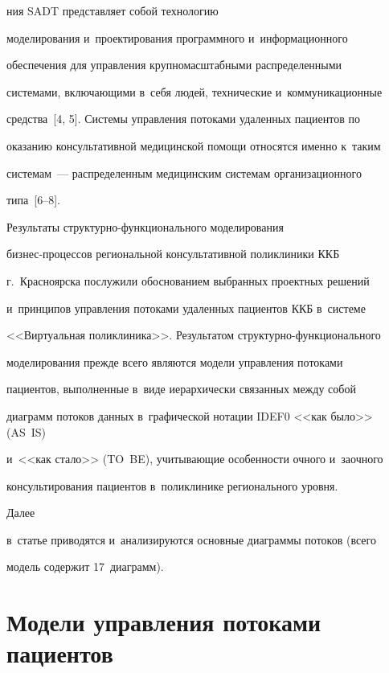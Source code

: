 \noindent


ния SADT представляет собой технологию 


моделирования и~проектирования программного и~информационного 


обеспечения для управления крупномасштабными распределенными 


системами, включающими в~себя людей, технические и~коммуникационные 


средства~[4, 5]. Системы управления потоками удаленных пациентов по 


оказанию консультативной медицинской помощи относятся именно к~таким 


системам~--- распределенным медицинским системам организационного 


типа~[6--8].


  


  Результаты структурно-функционального моделирования  


биз\-нес-про\-цес\-сов региональной консультативной поликлиники ККБ 


г.~Красноярска послужили обоснованием выбранных проектных решений 


и~принципов управления потоками удаленных пациентов ККБ в~системе 


<<Виртуальная поликлиника>>. Результатом струк\-тур\-но-функ\-ци\-о\-наль\-но\-го 


моделирования прежде всего являются модели управления потоками 


пациентов, выполненные в~виде иерархически связанных между собой 


диаграмм потоков данных в~графической нотации IDEF0 <<как было>> (AS~IS) 


и~<<как стало>> (TO~BE), учитывающие особенности очного и~заочного 


консультирования пациентов в~поликлинике регионального уровня. 





Далее 


в~статье приводятся и~анализируются основные диаграммы потоков (всего 


модель содержит 17~диаграмм).


  


\section{Модели управления потоками пациентов}





